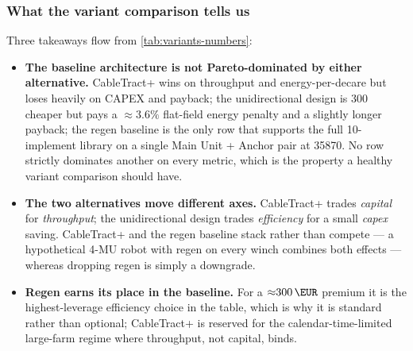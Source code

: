 \documentclass[11pt,a4paper]{article}
\begin{document}
\subsubsection{What the variant comparison tells us}\label{sec:variants-discussion}

Three takeaways flow from \cref{tab:variants-numbers}:

\begin{itemize}[leftmargin=1.6em,itemsep=0.2em]
    \item \textbf{The baseline architecture is not Pareto-dominated by either alternative.} CableTract+ wins on throughput and energy-per-decare but loses heavily on CAPEX and payback; the unidirectional design is \SI{300}{\EUR} cheaper but pays a ${\approx}3.6\%$ flat-field energy penalty and a slightly longer payback; the regen baseline is the only row that supports the full 10-implement library on a single Main Unit + Anchor pair at \SI{35870}{\EUR}. No row strictly dominates another on every metric, which is the property a healthy variant comparison should have.
    \item \textbf{The two alternatives move different axes.} CableTract+ trades \emph{capital} for \emph{throughput}; the unidirectional design trades \emph{efficiency} for a small \emph{capex} saving. CableTract+ and the regen baseline stack rather than compete --- a hypothetical 4-MU robot with regen on every winch combines both effects --- whereas dropping regen is simply a downgrade.
    \item \textbf{Regen earns its place in the baseline.} For a ${\approx}\SI{300}{\EUR}$ premium it is the highest-leverage efficiency choice in the table, which is why it is standard rather than optional; CableTract+ is reserved for the calendar-time-limited large-farm regime where throughput, not capital, binds.
\end{itemize}
\end{document}

